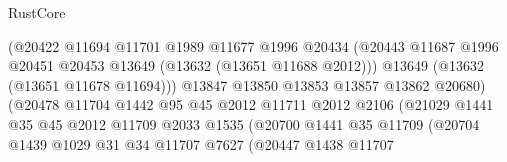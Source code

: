 \begin{lexlean}{RustCore}
\begin{coremodule}
                                        (@20422
                                          @11694
                                          @11701
                                          @1989
                                          @11677
                                          @1996
                                          @20434
                                          (@20443
                                            @11687
                                            @1996
                                            @20451
                                            @20453
                                            @13649
                                            (@13632 (@13651 @11688 @2012)))
                                          @13649
                                          (@13632 (@13651 @11678 @11694)))
                                        @13847
                                        @13850
                                        @13853
                                        @13857
                                        @13862
                                        @20680)
                                      (@20478
                                        @11704
                                        @1442
                                        @95
                                        @45
                                        @2012
                                        @11711
                                        @2012
                                        @2106
                                        (@21029
                                          @1441
                                          @35
                                          @45
                                          @2012
                                          @11709
                                          @2033
                                          @1535
                                          (@20700
                                            @1441
                                            @35
                                            @11709
                                            (@20704
                                              @1439
                                              @1029
                                              @31
                                              @34
                                              @11707
                                              @7627
                                              (@20447
                                                @1438
                                                @11707

\end{coremodule}
\end{lexlean}
